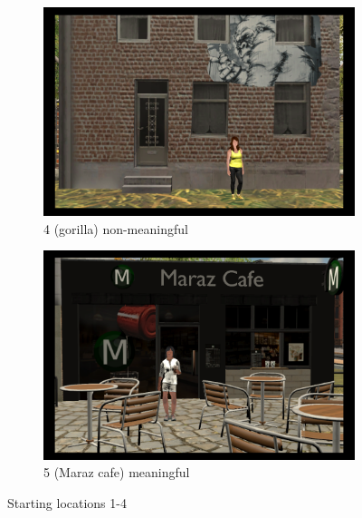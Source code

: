 \begin{figure}[!htb]
	
	\begin{subfigure}[b]{0.48\linewidth}
		\includegraphics[width=\linewidth]{figures/starting_locations_appx/04_R(gorilla)_A.PNG}
		\caption{4 (gorilla) non-meaningful}
		\label{fig:04_R(gorilla)_A}
	\end{subfigure}
	\begin{subfigure}[b]{0.48\linewidth}
		\includegraphics[width=\linewidth]{figures/starting_locations_appx/05_S(Maraz cafe)_A.PNG}
		\caption{5 (Maraz cafe) meaningful}
		\label{fig:05_S(Maraz cafe)_A}
	\end{subfigure}
	
	\caption[Starting locations 1-4]{Starting locations 1-4}
	\label{fig:starting_locations_1-4}
\end{figure}

